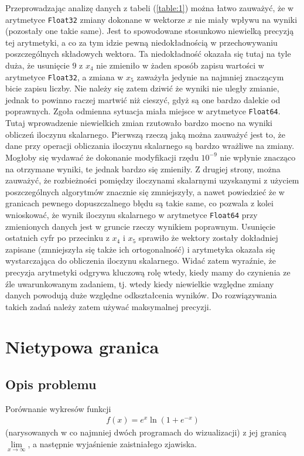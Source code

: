 \documentclass[11pt]{mk-polish-lab-report}
\begin{document}
Przeprowadzając analizę danych z tabeli (\ref{table:1}) można łatwo zauważyć, że w arytmetyce \texttt{Float32} zmiany dokonane w wektorze $x$ nie miały wpływu na wyniki (pozostały one takie same). Jest to spowodowane stosunkowo niewielką precyzją tej arytmetyki, a co za tym idzie pewną niedokładnością w przechowywaniu poszczególnych składowych wektora. Ta niedokładność okazała się tutaj na tyle duża, że usunięcie $9$ z $x_4$ nie zmieniło w żaden sposób zapisu wartości w arytmetyce \texttt{Float32}, a zmiana w $x_5$ zaważyła jedynie na najmniej znaczącym bicie zapisu liczby. Nie należy się zatem dziwić że wyniki nie uległy zmianie, jednak to powinno raczej martwić niż cieszyć, gdyż są one bardzo dalekie od poprawnych. Zgoła odmienna sytuacja miała miejsce w arytmetyce \texttt{Float64}. Tutaj wprowadzenie niewielkich zmian rzutowało bardzo mocno na wyniki obliczeń iloczynu skalarnego. Pierwszą rzeczą jaką można zauważyć jest to, że dane przy operacji obliczania iloczynu skalarnego są bardzo wrażliwe na zmiany. Mogłoby się wydawać że dokonanie modyfikacji rzędu $10^{-9}$ nie wpłynie znacząco na otrzymane wyniki, te jednak bardzo się zmieniły. Z drugiej strony, można zauważyć, że rozbieżności pomiędzy iloczynami skalarnymi uzyskanymi z użyciem poszczególnych algorytmów znacznie się zmniejszyły, a nawet powiedzieć że w granicach pewnego dopuszczalnego błędu są takie same, co pozwala z kolei wnioskować, że wynik iloczynu skalarnego w arytmetyce \texttt{Float64} przy zmienionych danych jest w gruncie rzeczy wynikiem poprawnym. Usunięcie ostatnich cyfr po przecinku z $x_4$ i $x_5$ sprawiło że wektory zostały dokładniej zapisane (zmniejszyła się także ich ortogonalność) i arytmetyka okazała się wystarczająca do obliczenia iloczynu skalarnego. Widać zatem wyraźnie, że precyzja arytmetyki odgrywa kluczową rolę wtedy, kiedy mamy do czynienia ze źle uwarunkowanym zadaniem, tj. wtedy kiedy niewielkie względne zmiany danych powodują duże względne odkształcenia wyników. Do rozwiązywania takich zadań należy zatem używać maksymalnej precyzji.

\section{Nietypowa granica}

\subsection{Opis problemu}

Porównanie wykresów funkcji
\begin{align}
f(x) = e^x \ln(1 + e^{-x})
\label{eq:zad2}
\end{align}
(narysowanych w co najmniej dwóch programach do wizualizacji) z jej granicą $\mathop {\lim }\limits_{x \to \infty}$, a następnie wyjaśnienie zaistniałego zjawiska.
\end{document}
